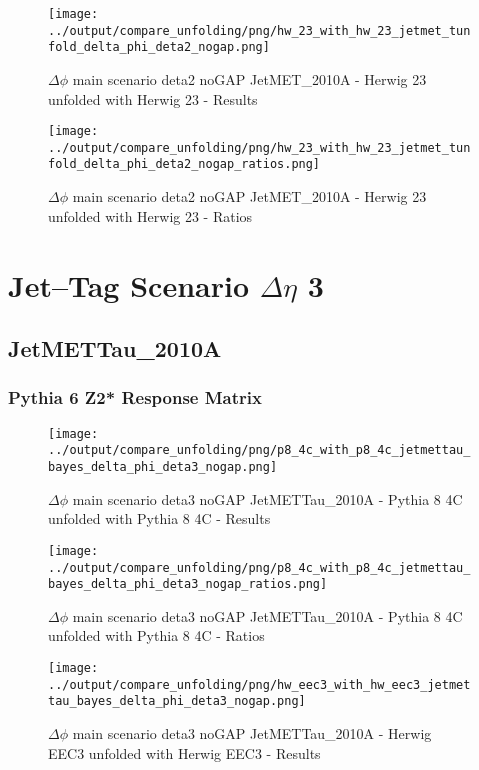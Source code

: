 \documentclass[11pt]{book}
\begin{document}
\begin{figure}[ht]
\centering
\texttt{[image: ../output/compare\_unfolding/png/hw\_23\_with\_hw\_23\_jetmet\_tunfold\_delta\_phi\_deta2\_nogap.png]}
\caption{$\Delta\phi$ main scenario deta2 noGAP JetMET\_2010A - Herwig 23 unfolded with Herwig 23 - Results}
\label{hw_23_hw_23_jetmet_tunfold_delta_phi_deta2_nogap_a}
\end{figure}

\begin{figure}[ht]
\centering
\texttt{[image: ../output/compare\_unfolding/png/hw\_23\_with\_hw\_23\_jetmet\_tunfold\_delta\_phi\_deta2\_nogap\_ratios.png]}
\caption{$\Delta\phi$ main scenario deta2 noGAP JetMET\_2010A - Herwig 23 unfolded with Herwig 23 - Ratios}
\label{hw_23_hw_23_jetmet_tunfold_delta_phi_deta2_nogap_b}
\end{figure}




\newpage
\chapter{Jet--Tag Scenario $\Delta\eta$ 3}
\section{JetMETTau\_2010A}
\subsection{Pythia 6 Z2* Response Matrix}



\begin{figure}[ht]
\centering
\texttt{[image: ../output/compare\_unfolding/png/p8\_4c\_with\_p8\_4c\_jetmettau\_bayes\_delta\_phi\_deta3\_nogap.png]}
\caption{$\Delta\phi$ main scenario deta3 noGAP JetMETTau\_2010A - Pythia 8 4C unfolded with Pythia 8 4C - Results}
\label{p8_p8_jetmettau_bayes_delta_phi_deta3_nogap_a}
\end{figure}

\begin{figure}[ht]
\centering
\texttt{[image: ../output/compare\_unfolding/png/p8\_4c\_with\_p8\_4c\_jetmettau\_bayes\_delta\_phi\_deta3\_nogap\_ratios.png]}
\caption{$\Delta\phi$ main scenario deta3 noGAP JetMETTau\_2010A - Pythia 8 4C unfolded with Pythia 8 4C - Ratios}
\label{p8_p8_jetmettau_bayes_delta_phi_deta3_nogap_b}
\end{figure}

\begin{figure}[ht]
\centering
\texttt{[image: ../output/compare\_unfolding/png/hw\_eec3\_with\_hw\_eec3\_jetmettau\_bayes\_delta\_phi\_deta3\_nogap.png]}
\caption{$\Delta\phi$ main scenario deta3 noGAP JetMETTau\_2010A - Herwig EEC3 unfolded with Herwig EEC3 - Results}
\label{hw_eec3_hw_eec3_jetmettau_bayes_delta_phi_deta3_nogap_a}
\end{figure}
\end{document}
